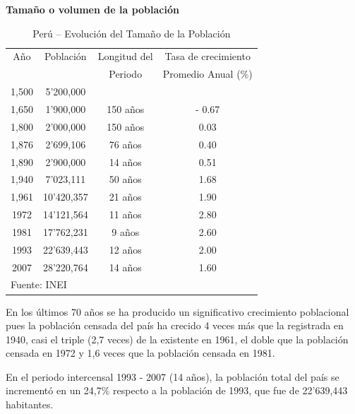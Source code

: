 \documentclass[8pt,a4paper]{beamer}
\begin{document}
{\begin{frame}{\textbf{Tamaño o volumen de la población}}
\begin{table}[!hbt]
\begin{center}
\caption{Perú – Evolución del Tamaño de la Población}
\label{tab:1}
\begin{tabular}{|c|c|c|>{\columncolor[gray]{0.7}}c|}
\hline
Año & Población & Longitud del  & Tasa de crecimiento \\
	&			&	Periodo     & Promedio Anual (\%) \\\hline
1,500 & 5'200,000 &             & \\\hline
1,650 & 1'900,000 & 150 años    & - 0.67 \\\hline
1,800 & 2'000,000 & 150 años    & 0.03 \\\hline
1,876 & 2'699,106 & 76 años     & 0.40 \\\hline
1,890 & 2'900,000 & 14 años		& 0.51 \\\hline
1,940 & 7'023,111 & 50 años		& 1.68 \\\hline
1,961 & 10'420,357& 21 años     & 1.90 \\\hline
1972  & 14'121,564& 11 años     & 2.80 \\\hline
1981  & 17'762,231& 9 años		& 2.60 \\\hline
1993  &	22'639,443& 12 años 	& 2.00 \\\hline
2007  & 28'220,764& 14 años     & 1.60 \\\hline
\multicolumn{4}{|l|}{\small Fuente: INEI}\\\hline
\end{tabular}
\end{center}
\end{table}

\end{frame}

\begin{frame}{}
\setlength{\parskip}{5px}
En los últimos 70 años se ha producido un significativo crecimiento poblacional pues la población censada del país ha crecido 4 veces más que la registrada en 1940, casi el triple (2,7 veces) de la existente en 1961, el doble que la población censada en 1972 y 1,6 veces que la población censada en 1981. 

En el periodo intercensal 1993 - 2007 (14 años), la población total del país se incrementó en un 24,7\% respecto a la población de 1993, que fue de 22’639,443 habitantes.
\end{frame}


\begin{frame}{ }


\end{frame}}
\end{document}
